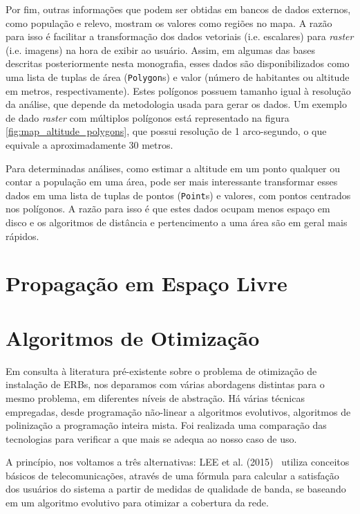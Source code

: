 \documentclass[]{politex}
\begin{document}
Por fim, outras informações que podem ser obtidas em bancos de dados externos,
como população e relevo, mostram os valores como regiões no mapa. A razão para
isso é facilitar a transformação dos dados vetoriais (i.e. escalares) para
\textit{raster} (i.e. imagens) na hora de exibir ao usuário. Assim, em algumas
das bases descritas posteriormente nesta monografia, esses dados são
disponibilizados como uma lista de tuplas de área (\texttt{Polygon}s) e valor
(número de habitantes ou altitude em metros, respectivamente). Estes polígonos
possuem tamanho igual à resolução da análise, que depende da metodologia usada
para gerar os dados. Um exemplo de dado \textit{raster} com múltiplos polígonos
está representado na figura \ref{fig:map_altitude_polygons}, que possui
resolução de 1 arco-segundo, o que equivale a aproximadamente 30 metros.

Para determinadas análises, como estimar a altitude em um ponto qualquer ou
contar a população em uma área, pode ser mais interessante transformar esses
dados em uma lista de tuplas de pontos (\texttt{Point}s) e valores, com pontos
centrados nos polígonos. A razão para isso é que estes dados ocupam menos espaço
em disco e os algoritmos de distância e pertencimento a uma área são em geral
mais rápidos.

\section{Propagação em Espaço Livre}


\section{Algoritmos de Otimização}

Em consulta à literatura pré-existente sobre o problema de otimização de
instalação de ERBs, nos deparamos com várias abordagens distintas para o mesmo
problema, em diferentes níveis de abstração. Há várias técnicas empregadas,
desde programação não-linear a algoritmos evolutivos, algoritmos de polinização
a programação inteira mista. Foi realizada uma comparação das tecnologias para
verificar a que mais se adequa ao nosso caso de uso.

A princípio, nos voltamos a três alternativas: LEE et al. (2015)~
\cite{evolutivo} utiliza conceitos básicos de telecomunicações, através de uma
fórmula para calcular a satisfação dos usuários do sistema a partir de medidas
de qualidade de banda, se baseando em um algoritmo evolutivo para otimizar
a cobertura da rede.
\end{document}
